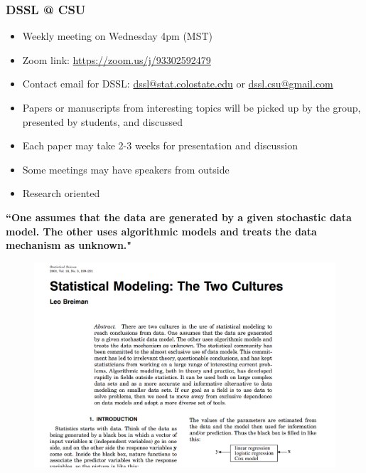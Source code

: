 \documentclass[10pt]{beamer}
\begin{document}
\begin{frame}
\frametitle{DSSL @ CSU}
\begin{itemize}
\item Weekly meeting on Wednesday 4pm (MST)
\item Zoom link: \url{https://zoom.us/j/93302592479}
\item Contact email for DSSL: \url{dssl@stat.colostate.edu} or \url{dssl.csu@gmail.com}
\item Papers or manuscripts from interesting topics will be picked up by the group, presented by students, and discussed  
\item Each paper may take 2-3 weeks for presentation and discussion
\item Some meetings may have speakers from outside
\item Research oriented 
\end{itemize}
\end{frame}
  




\begin{frame}
\begin{spacing}{1.25}
\begin{center}
{\color{blue} \large  \bf ``One assumes that the data are generated
by a given stochastic data model. The other uses algorithmic models and
treats the data mechanism as unknown."}
 \end{center}
\begin{figure}[h]
\centering
\includegraphics[scale=0.25]{f00.png}
\end{figure}
\end{spacing}
\end{frame}
\end{document}
